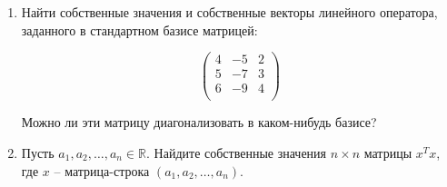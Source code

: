 \documentclass[a4paper,12pt]{article}
\begin{document}
\begin{enumerate}
\vspace{5pt}


\item Найти собственные значения и собственные векторы линейного оператора, заданного в стандартном базисе матрицей:



$$
\begin{pmatrix}
{4}&{-5}&{2}\\
{5}&{-7}&{3}\\
{6}&{-9}&{4}\\
\end{pmatrix}
$$

Можно ли эти матрицу диагонализовать в каком-нибудь базисе?

\vspace{5pt}


\item Пусть $a_1, a_2, \dots, a_n \in \mathbb{R}$. Найдите собственные значения $n \times n$ матрицы $x^T x$, где $x$ -- матрица-строка $(a_1, a_2,\ldots,a_n)$.


\end{enumerate}
\end{document}
